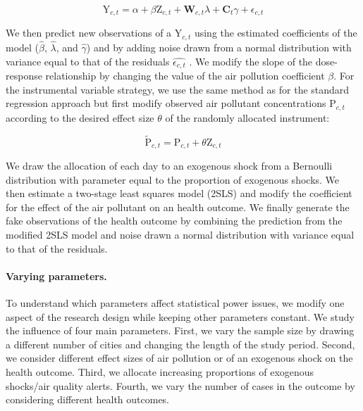 \documentclass[12pt]{article}
\begin{document}
        \begin{equation}
        \text{Y}_{c,t} = \alpha + \beta\text{Z}_{c,t} + \textbf{W}_{c,t}\lambda + \textbf{C}_{t}\gamma + \epsilon_{c,t}
        \end{equation}
        
        \noindent We then predict new observations of a $\text{Y}_{c,t}$ using the estimated coefficients of the model ($\hat{\beta}$, $\hat{\lambda}$, and $\hat{\gamma}$) and by adding noise drawn from a normal distribution with variance equal to that of the residuals $\widehat{\epsilon_{c,t}}$ \citep{peng2006model}. We modify the slope of the dose-response relationship by changing the value of the air pollution coefficient $\beta$. For the instrumental variable strategy, we use the same method as for the standard regression approach but first modify observed air pollutant concentrations $\text{P}_{c,t}$ according to the desired effect size $\theta$ of the randomly allocated instrument: 
        
        \begin{equation}
        \widetilde{\text{P}}_{c,t} = \text{P}_{c,t} + \theta\text{Z}_{c,t}
        \end{equation}
        
        \noindent We draw the allocation of each day to an exogenous shock from a Bernoulli distribution with parameter equal to the proportion of exogenous shocks. We then estimate a two-stage least squares model (2SLS) and modify the coefficient for the effect of the air pollutant on an health outcome. We finally generate the fake observations of the health outcome by combining the prediction from the modified 2SLS model and noise drawn a normal distribution with variance equal to that of the residuals.
        
        \paragraph{Varying parameters.} To understand which parameters affect statistical power issues, we modify one aspect of the research design while keeping other parameters constant. We study the influence of four main parameters. First, we vary the sample size by drawing a different number of cities and changing the length of the study period. Second, we consider different effect sizes of air pollution or of an exogenous shock on the health outcome. Third, we allocate increasing proportions of exogenous shocks/air quality alerts. Fourth, we vary the number of cases in the outcome by considering different health outcomes.
\end{document}
